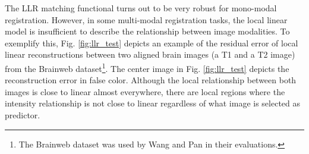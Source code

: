 The LLR matching functional turns out to be very robust for mono-modal registration. However, in some multi-modal registration tasks, the local linear model is insufficient to describe the relationship between image modalities. To exemplify this, Fig. \ref{fig:llr_test} depicts an example of the residual error of local linear reconstructions between two aligned brain images (a T1 and a T2 image) from the Brainweb \cite{Cocosco1997} dataset\footnote{The Brainweb dataset was used by Wang and Pan \cite{Wang2014} in their evaluations.}. The center image in Fig. \ref{fig:llr_test} depicts the reconstruction error in false color. Although the local relationship between both images is close to linear almost everywhere, there are local regions where the intensity relationship is not close to linear regardless of what image is selected as predictor.\\


